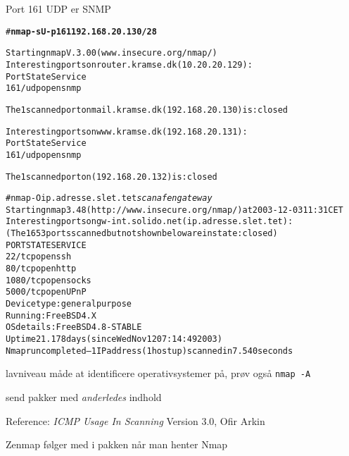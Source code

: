 \documentclass[20pt,landscape,a4paper,footrule]{foils}
\begin{document}

\begin{list1}
  \item Port 161 UDP er SNMP
\end{list1}

\begin{alltt}  
\small # {\bfseries nmap -sU -p 161 192.168.20.130/28}

Starting nmap V. 3.00 ( www.insecure.org/nmap/ )
Interesting ports on router.kramse.dk (10.20.20.129):
Port       State       Service
161/udp    open        snmp                    

The 1 scanned port on mail.kramse.dk (192.168.20.130) is: closed

Interesting ports on www.kramse.dk (192.168.20.131):
Port       State       Service
161/udp    open        snmp                    

The 1 scanned port on  (192.168.20.132) is: closed
\end{alltt}

\begin{alltt}
\footnotesize
# nmap -O ip.adresse.slet.tet \emph{scan af en gateway}
Starting nmap 3.48 ( http://www.insecure.org/nmap/ ) at 2003-12-03 11:31 CET
Interesting ports on gw-int.solido.net (ip.adresse.slet.tet):
(The 1653 ports scanned but not shown below are in state: closed)
PORT     STATE SERVICE
22/tcp   open  ssh
80/tcp   open  http
1080/tcp open  socks
5000/tcp open  UPnP
Device type: general purpose
Running: FreeBSD 4.X
OS details: FreeBSD 4.8-STABLE
Uptime 21.178 days (since Wed Nov 12 07:14:49 2003)
Nmap run completed -- 1 IP address (1 host up) scanned in 7.540 seconds
\end{alltt}

\begin{list2}
\item lavniveau måde at identificere operativsystemer på, prøv også
  \verb+nmap -A+
\item send pakker med \emph{anderledes} indhold
\item Reference: \emph{ICMP Usage In Scanning} Version 3.0,
  Ofir Arkin\\ 
\end{list2}


\centerline{Zenmap følger med i pakken når man henter Nmap }
\end{document}
